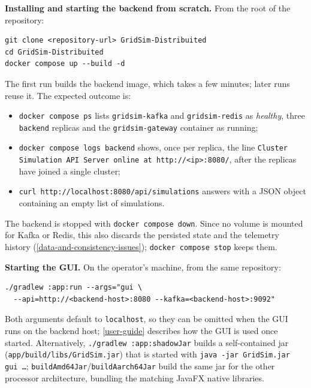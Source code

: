 \documentclass{scrreprt}
\begin{document}
\textbf{Installing and starting the backend from scratch.} From the root of the repository:
\begin{verbatim}
git clone <repository-url> GridSim-Distribuited
cd GridSim-Distribuited
docker compose up --build -d
\end{verbatim}
The first run builds the backend image, which takes a few minutes; later runs reuse it. The
expected outcome is:
\begin{itemize}
  \item \texttt{docker compose ps} lists \texttt{gridsim-kafka} and \texttt{gridsim-redis} as
  \emph{healthy}, three \texttt{backend} replicas and the \texttt{gridsim-gateway} container
  as running;
  \item \texttt{docker compose logs backend} shows, once per replica, the line
  \texttt{Cluster Simulation API Server online at http://<ip>:8080/}, after the replicas have
  joined a single cluster;
  \item \texttt{curl http://localhost:8080/api/simulations} answers with a JSON object
  containing an empty list of simulations.
\end{itemize}
The backend is stopped with \texttt{docker compose down}. Since no volume is mounted for Kafka
or Redis, this also discards the persisted state and the telemetry history
(\cref{data-and-consistency-issues}); \texttt{docker compose stop} keeps them.

\textbf{Starting the GUI.} On the operator's machine, from the same repository:
\begin{verbatim}
./gradlew :app:run --args="gui \
  --api=http://<backend-host>:8080 --kafka=<backend-host>:9092"
\end{verbatim}
Both arguments default to \texttt{localhost}, so they can be omitted when the GUI runs on the
backend host; \cref{user-guide} describes how the GUI is used once started. Alternatively,
\texttt{./gradlew :app:shadowJar} builds a self-contained jar
(\texttt{app/build/libs/GridSim.jar}) that is started with \texttt{java -jar GridSim.jar gui
\ldots}; \texttt{buildAmd64Jar}/\texttt{buildAarch64Jar} build the same jar for the other
processor architecture, bundling the matching JavaFX native libraries.
\end{document}
